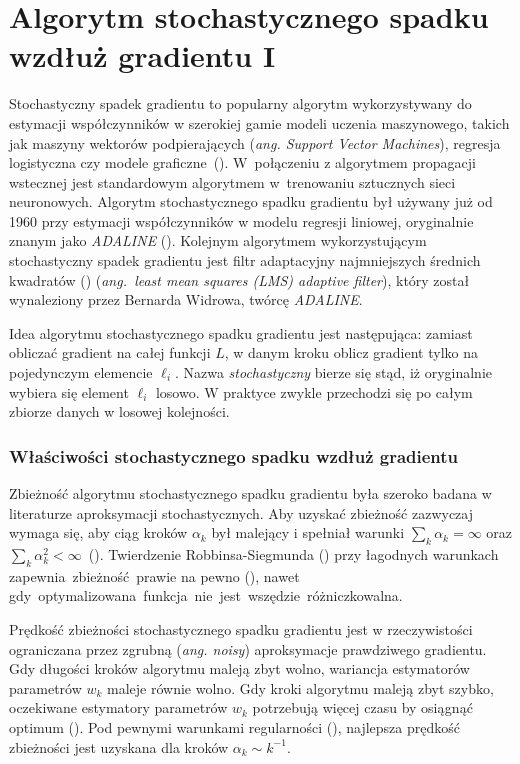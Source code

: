 \section{Algorytm stochastycznego spadku wzdłuż gradientu I}\label{SGD}
\vspace{-5pt}
Stochastyczny spadek gradientu to popularny algorytm wykorzystywany do estymacji współczynników w szerokiej gamie modeli uczenia maszynowego, takich jak maszyny wektorów podpierających (\textit{ang. Support Vector Machines}), regresja logistyczna czy modele graficzne~(\cite{finkel}). W~połączeniu z algorytmem propagacji wstecznej jest standardowym algorytmem w~trenowaniu sztucznych sieci neuronowych. Algorytm stochastycznego spadku gradientu był używany już od 1960 przy estymacji współczynników w modelu regresji liniowej, oryginalnie znanym jako \textit{ADALINE} (\cite{ADALINE}). Kolejnym algorytmem wykorzystującym stochastyczny spadek gradientu jest filtr adaptacyjny najmniejszych średnich kwadratów (\cite{widrow2}) (\textit{ang.~least mean squares (LMS) adaptive filter}), który został wynaleziony przez Bernarda Widrowa, twórcę \textit{ADALINE}.

Idea algorytmu stochastycznego spadku gradientu jest następująca: zamiast obliczać gradient na całej funkcji $L$, w danym kroku oblicz
gradient tylko na pojedynczym elemencie $\ell_{i}$. Nazwa \textit{stochastyczny} bierze się stąd, iż oryginalnie wybiera
się element $\ell_{i}$ losowo. W praktyce zwykle przechodzi się po całym zbiorze danych w losowej kolejności.
\vspace{-10pt}
\subsubsection{Właściwości stochastycznego spadku wzdłuż gradientu}
\vspace{-5pt}
Zbieżność algorytmu stochastycznego spadku gradientu była szeroko badana w literaturze aproksymacji stochastycznych. Aby uzyskać zbieżność zazwyczaj wymaga się, aby ciąg kroków $\alpha_k$ był malejący i spełniał warunki $\sum\nolimits_k \alpha_k = \infty$ oraz $\sum\nolimits_k \alpha_k^2 < \infty$~(\cite{bott1}).
Twierdzenie Robbinsa-Siegmunda (\cite{robbins}) przy łagodnych warunkach zapewnia~zbieżność~prawie na pewno (\cite{bottDOD}), nawet  gdy~optymalizowana~funkcja~nie~jest~wszędzie~różniczkowalna.

Prędkość zbieżności stochastycznego spadku gradientu jest w rzeczywistości ograniczana przez zgrubną (\textit{ang. noisy}) aproksymacje prawdziwego gradientu. Gdy długości kroków algorytmu
maleją zbyt wolno, wariancja estymatorów parametrów $w_k$ maleje równie wolno. Gdy kroki algorytmu maleją
zbyt szybko, oczekiwane estymatory parametrów $w_k$ potrzebują więcej czasu by osiągnąć optimum (\cite{bott1}). Pod pewnymi warunkami regularności (\cite{murata}), najlepsza prędkość zbieżności jest uzyskana dla kroków $\alpha_k\sim k^{-1}$.

